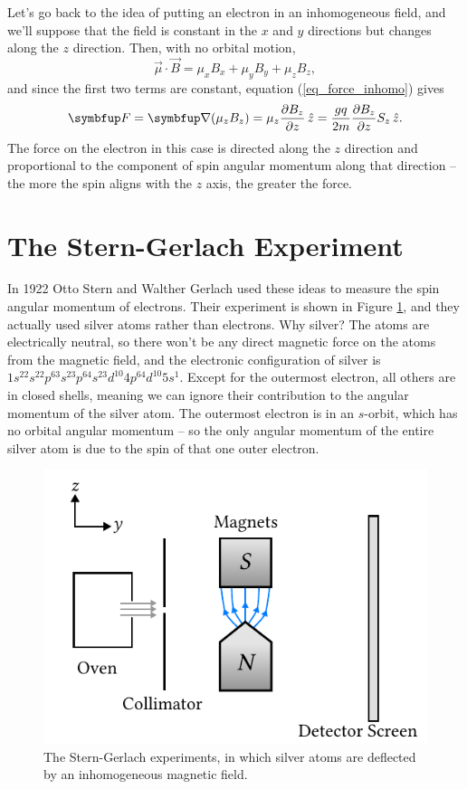 Let's go back to the idea of putting an electron in an inhomogeneous field, and we'll suppose that the field is constant in the $x$ and $y$ directions but changes along the $z$ direction.  Then, with no orbital motion,
\[
\vec{\mu} \cdot \vec{B} = \mu_x B_x + \mu_y B_y + \mu_z B_z,
\]  
and since the first two terms are constant, equation (\ref{eq_force_inhomo}) gives
\begin{equation}
\vec{F} = \grad ( \mu_z B_z ) = \mu_z \dfdx{B_z}{z} \, \hat{z} = \frac{gq}{2m} \dfdx{B_z}{z} S_z \, \hat{z}.
\label{eq_force_spin}
\end{equation}
The force on the electron in this case is directed along the $z$ direction and proportional to the component of spin angular momentum along that direction -- the more the spin aligns with the $z$ axis, the greater the force.
%
%
%

\section{The Stern-Gerlach Experiment}

In 1922 Otto Stern and Walther Gerlach used these ideas to measure the spin angular momentum of electrons.  Their experiment is shown in Figure \ref{fig_stern_gerlach_exp}, and they actually used silver atoms rather than electrons.  Why silver?  The atoms are electrically neutral, so there won't be any direct magnetic force on the atoms from the magnetic field, and the electronic configuration of silver is $1s^22s^22p^63s^23p^64s^23d^{10}4p^64d^{10}5s^1$.  Except for the outermost electron, all others are in closed shells, meaning we can ignore their contribution to the angular momentum of the silver atom.  The outermost electron is in an $s$-orbit, which has no orbital angular momentum -- so the only angular momentum of the entire silver atom is due to the spin of that one outer electron.

\begin{figure}
\centering\includegraphics[width=0.6\linewidth]{Figures/Chapter 1/fig_stern_gerlach_exp.pdf}
\caption{The Stern-Gerlach experiments, in which silver atoms are deflected by an inhomogeneous magnetic field.}
\label{fig_stern_gerlach_exp}
\end{figure}

